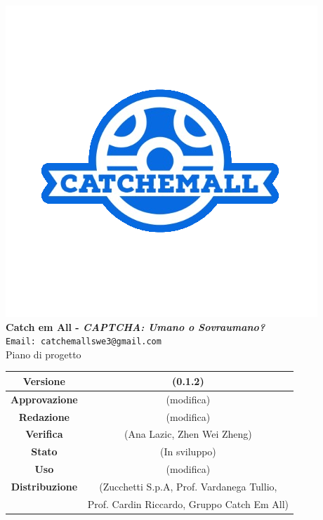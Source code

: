 \begin{titlepage}
\begin{center}
	\includegraphics[scale = 1.5]{img/logo.png}\\
	\bigskip
	\large \textbf{Catch em All - \textit{CAPTCHA: Umano o Sovraumano?}}\\
	\texttt{Email: catchemallswe3@gmail.com}\\
	\vfill
	{\fontsize{1.5cm}{0}\selectfont Piano di progetto}\\
	\vfill
	\begin{tabularx}{\textwidth}{|c|c|}
		\hline
		\textbf{Versione} & (0.1.2)\\
		\hline
		\textbf{Approvazione} & (modifica)\\
		\hline
		\textbf{Redazione} & (modifica)\\
		\hline
		\textbf{Verifica} & (Ana Lazic, Zhen Wei Zheng)\\
		\hline
		\textbf{Stato} & (In sviluppo)\\
		\hline
		\textbf{Uso} & (modifica)\\
		\hline
		\textbf{Distribuzione} & (Zucchetti S.p.A, Prof. Vardanega Tullio, \\
		&  Prof. Cardin Riccardo, Gruppo Catch Em All)\\
		\hline
	\end{tabularx}
\end{center}
\end{titlepage}

